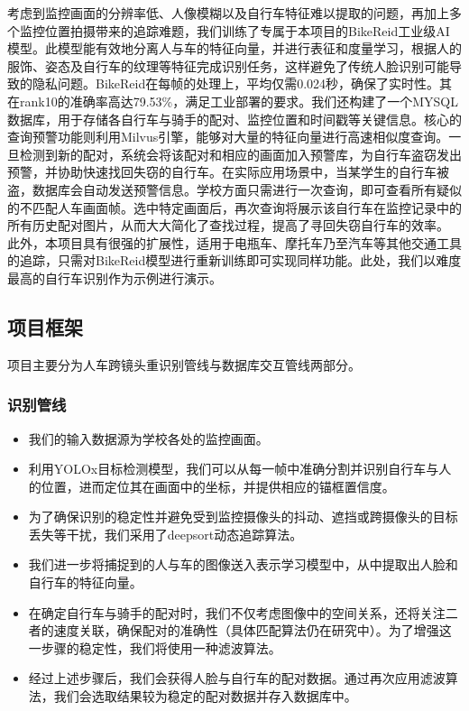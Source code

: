 \documentclass{article}
\begin{document}
考虑到监控画面的分辨率低、人像模糊以及自行车特征难以提取的问题，再加上多个监控位置拍摄带来的追踪难题，我们训练了专属于本项目的BikeReid工业级AI模型。此模型能有效地分离人与车的特征向量，并进行表征和度量学习，根据人的服饰、姿态及自行车的纹理等特征完成识别任务，这样避免了传统人脸识别可能导致的隐私问题。BikeReid在每帧的处理上，平均仅需0.024秒，确保了实时性。其在rank10的准确率高达79.53\%，满足工业部署的要求。我们还构建了一个MYSQL数据库，用于存储各自行车与骑手的配对、监控位置和时间戳等关键信息。核心的查询预警功能则利用Milvus引擎，能够对大量的特征向量进行高速相似度查询。一旦检测到新的配对，系统会将该配对和相应的画面加入预警库，为自行车盗窃发出预警，并协助快速找回失窃的自行车。在实际应用场景中，当某学生的自行车被盗，数据库会自动发送预警信息。学校方面只需进行一次查询，即可查看所有疑似的不匹配人车画面帧。选中特定画面后，再次查询将展示该自行车在监控记录中的所有历史配对图片，从而大大简化了查找过程，提高了寻回失窃自行车的效率。\\

此外，本项目具有很强的扩展性，适用于电瓶车、摩托车乃至汽车等其他交通工具的追踪，只需对BikeReid模型进行重新训练即可实现同样功能。此处，我们以难度最高的自行车识别作为示例进行演示。

\subsection{项目框架}

项目主要分为人车跨镜头重识别管线与数据库交互管线两部分。

\subsubsection{识别管线}

\begin{itemize}
    \item 我们的输入数据源为学校各处的监控画面。
    \item 利用YOLOx目标检测模型，我们可以从每一帧中准确分割并识别自行车与人的位置，进而定位其在画面中的坐标，并提供相应的锚框置信度。
    \item 为了确保识别的稳定性并避免受到监控摄像头的抖动、遮挡或跨摄像头的目标丢失等干扰，我们采用了deepsort动态追踪算法。
    \item 我们进一步将捕捉到的人与车的图像送入表示学习模型中，从中提取出人脸和自行车的特征向量。
    \item 在确定自行车与骑手的配对时，我们不仅考虑图像中的空间关系，还将关注二者的速度关联，确保配对的准确性（具体匹配算法仍在研究中）。为了增强这一步骤的稳定性，我们将使用一种滤波算法。
    \item 经过上述步骤后，我们会获得人脸与自行车的配对数据。通过再次应用滤波算法，我们会选取结果较为稳定的配对数据并存入数据库中。
\end{itemize}
\end{document}
